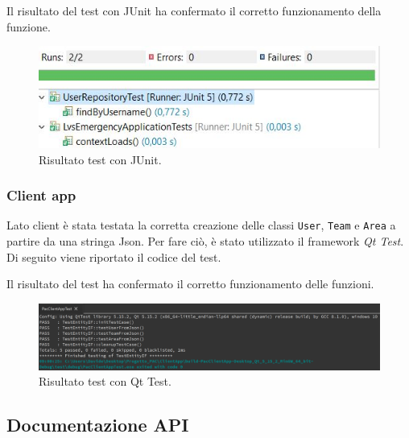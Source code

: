 

Il risultato del test con JUnit ha confermato il corretto funzionamento della funzione.

\begin{figure}[h!]
	\centering
	\includegraphics[width=1\linewidth]{./Iterazione 2/ImageFiles/TestJUnit}
	\caption{Risultato test con JUnit.}
	\label{fig:RisultatiTestJunitIT2}
\end{figure}

\subsubsection{Client app}
Lato client è stata testata la corretta creazione delle classi \texttt{User}, \texttt{Team} e \texttt{Area} a partire da una stringa Json. Per fare ciò, è stato utilizzato il framework \textit{Qt Test}. Di seguito viene riportato il codice del test.
 


Il risultato del test ha confermato il corretto funzionamento delle funzioni.

\begin{figure}[h!]
	\centering
	\includegraphics[width=1\linewidth]{./Iterazione 2/ImageFiles/TestQtTest}
	\caption{Risultato test con Qt Test.}
	\label{fig:RisultatiTestQTestIT2}
\end{figure}

\subsection{Documentazione API}

